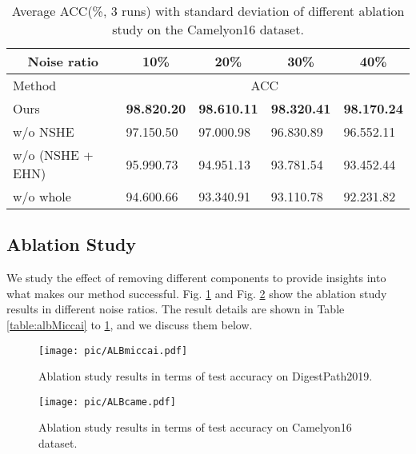 \begin{table}[]
\scriptsize
\centering
\caption{Average ACC(\%, 3 runs) with standard deviation of different ablation study on the Camelyon16 dataset.}
\label{table:albCame}
\begin{tabular}{lllll}
\toprule
\multicolumn{1}{c}{Noise ratio}            & \multicolumn{1}{c}{10\%} & \multicolumn{1}{c}{20\%} & \multicolumn{1}{c}{30\%} & \multicolumn{1}{c}{40\%} \\ \midrule
Method                 & \multicolumn{4}{c}{ACC}                                                                                     \\ \midrule
Ours                                       & \textbf{98.820.20}      & \textbf{98.610.11}      & \textbf{98.320.41}      & \textbf{98.170.24}     \\ 
w/o NSHE                        & 97.150.50               & 97.000.98               & 96.830.89               & 96.552.11              \\ 
w/o (NSHE + EHN)       & 95.990.73               & 94.951.13               & 93.781.54               & 93.452.44              \\ 
w/o whole & 94.600.66               & 93.340.91               & 93.110.78               & 92.231.82              \\ \bottomrule
\end{tabular}
\end{table}


\subsection{Ablation Study}

We study the effect of removing different components to provide insights into what makes our method successful. Fig. \ref{fig:albMiccai} and Fig. \ref{fig:albCame} show the ablation study results in different noise ratios. The result details are shown in Table \ref{table:albMiccai} to \ref{table:albCame}, and we discuss them below.



\begin{figure}[]
  \centering
  \texttt{[image: pic/ALBmiccai.pdf]}
\caption{{Ablation study results in terms of test accuracy on DigestPath2019.}}
  \label{fig:albMiccai}
\end{figure}
\begin{figure}[]
  \centering
  \texttt{[image: pic/ALBcame.pdf]}
\caption{{Ablation study results in terms of test accuracy on Camelyon16 dataset.}}
  \label{fig:albCame}
\end{figure}


